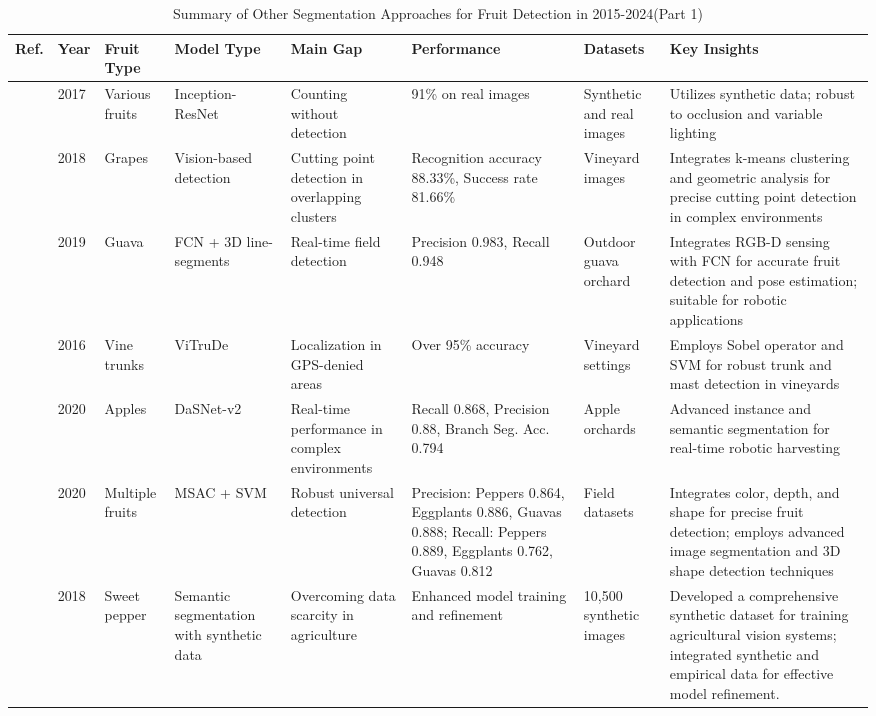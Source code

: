\documentclass[a4paper,fleqn]{cas-dc}
\begin{document}
\begin{table}[htbp]
	\centering
	\footnotesize 
	\caption{Summary of Other Segmentation Approaches for Fruit Detection in 2015-2024(Part 1)} 
	\label{tab:machinelearning-based} 
	\begin{tabular}{@{}p{0.4cm}p{0.4cm}p{1.4cm}p{1.4cm}p{2cm}p{2cm}p{2cm}p{4.5cm}@{}}
	\toprule
	\textbf{Ref.} & \textbf{Year} & \textbf{Fruit Type} & \textbf{Model Type} & \textbf{Main Gap} & \textbf{Performance} & \textbf{Datasets} & \textbf{Key Insights} \\ \midrule
\cite{rahnemoonfar2017deep} & 2017 & Various fruits & Inception-ResNet & Counting without detection & 91\% on real images & Synthetic and real images & Utilizes synthetic data; robust to occlusion and variable lighting \\  \midrule
\cite{luo2018vision} & 2018 & Grapes & Vision-based detection & Cutting point detection in overlapping clusters & Recognition accuracy 88.33\%, Success rate 81.66\% & Vineyard images & Integrates k-means clustering and geometric analysis for precise cutting point detection in complex environments \\  \midrule
 \cite{lin2019guava} & 2019 & Guava & FCN + 3D line-segments & Real-time field detection & Precision 0.983, Recall 0.948 & Outdoor guava orchard & Integrates RGB-D sensing with FCN for accurate fruit detection and pose estimation; suitable for robotic applications \\ \midrule
\cite{mendes2016vine} & 2016 & Vine trunks & ViTruDe & Localization in GPS-denied areas & Over 95\% accuracy & Vineyard settings & Employs Sobel operator and SVM for robust trunk and mast detection in vineyards \\ \midrule
\cite{kang2020fruit} & 2020 & Apples & DaSNet-v2 & Real-time performance in complex environments & Recall 0.868, Precision 0.88, Branch Seg. Acc. 0.794 & Apple orchards & Advanced instance and semantic segmentation for real-time robotic harvesting \\ \midrule
\cite{lin2020color} & 2020 & Multiple fruits & MSAC + SVM & Robust universal detection & Precision: Peppers 0.864, Eggplants 0.886, Guavas 0.888; Recall: Peppers 0.889, Eggplants 0.762, Guavas 0.812 & Field datasets & Integrates color, depth, and shape for precise fruit detection; employs advanced image segmentation and 3D shape detection techniques \\ \midrule
\cite{barth2018data} & 2018 & Sweet pepper & Semantic segmentation with synthetic data & Overcoming data scarcity in agriculture & Enhanced model training and refinement & 10,500 synthetic images & Developed a comprehensive synthetic dataset for training agricultural vision systems; integrated synthetic and empirical data for effective model refinement. \\ \midrule

\end{tabular}
\end{table}
\end{document}
